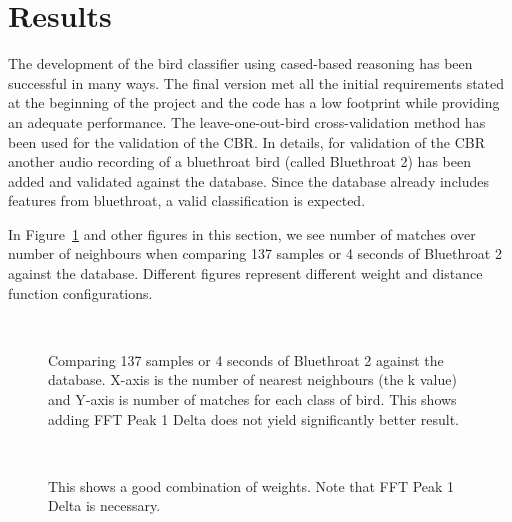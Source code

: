 \section{Results}
The development of the bird classifier using cased-based reasoning has
been successful in many ways. The final version met all the initial requirements
stated at the beginning of the project and the code has a low footprint while
providing an adequate performance. The leave-one-out-bird cross-validation method has been used
for the validation of the CBR. In details, for validation of the CBR another audio recording
of a bluethroat bird (called Bluethroat 2) has been added and validated against the database.
Since the database already includes features from bluethroat, a valid classification is expected.

In Figure~\ref{fig:results1} and other figures in this section, we see number of matches over number of
neighbours when comparing 137 samples or 4 seconds of Bluethroat 2 against the database. Different figures
represent different weight and distance function configurations.


\begin{figure}[htp]
    ~
    \caption{Comparing 137 samples or 4 seconds of Bluethroat 2 against the database. X-axis is the number of nearest neighbours (the k value) and Y-axis is number of matches for each class of bird.
    This shows adding FFT Peak 1 Delta does not yield significantly better result.  }
    \label{fig:results1}
\end{figure}

\begin{figure}[htp]

  ~
    \caption{This shows a good combination of weights. Note that FFT Peak 1 Delta is necessary.}
    \label{fig:results2}
\end{figure}



